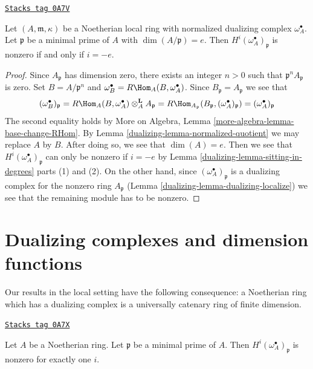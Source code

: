 \begin{lemma}
\label{dualizing-lemma-nonvanishing-generically-local}
\href{https://stacks.math.columbia.edu/tag/0A7V}{\texttt{Stacks tag 0A7V}}

Let $(A, \mathfrak m, \kappa)$ be a Noetherian local ring with
normalized dualizing complex $\omega_A^\bullet$.
Let $\mathfrak p$ be a minimal prime of $A$ with
$\dim(A/\mathfrak p) = e$. Then
$H^i(\omega_A^\bullet)_\mathfrak p$ is nonzero
if and only if $i = -e$.
\end{lemma}

\begin{proof}

Since $A_\mathfrak p$ has dimension zero, there exists an integer
$n > 0$ such that $\mathfrak p^nA_\mathfrak p$ is zero.
Set $B = A/\mathfrak p^n$ and
$\omega_B^\bullet = R\Hom_A(B, \omega_A^\bullet)$.
Since $B_\mathfrak p = A_\mathfrak p$ we see that
$$
(\omega_B^\bullet)_\mathfrak p =
R\Hom_A(B, \omega_A^\bullet) \otimes_A^\mathbf{L} A_\mathfrak p =
R\Hom_{A_\mathfrak p}(B_\mathfrak p, (\omega_A^\bullet)_\mathfrak p) =
(\omega_A^\bullet)_\mathfrak p
$$
The second equality holds by
More on Algebra, Lemma \ref{more-algebra-lemma-base-change-RHom}.
By Lemma \ref{dualizing-lemma-normalized-quotient} we may replace $A$ by $B$.
After doing so, we see that $\dim(A) = e$. Then we see that
$H^i(\omega_A^\bullet)_\mathfrak p$ can only be nonzero if $i = -e$
by Lemma \ref{dualizing-lemma-sitting-in-degrees} parts (1) and (2).
On the other hand, since $(\omega_A^\bullet)_\mathfrak p$
is a dualizing complex for the nonzero ring $A_\mathfrak p$
(Lemma \ref{dualizing-lemma-dualizing-localize})
we see that the remaining module has to be nonzero.
\end{proof}

\section{Dualizing complexes and dimension functions}
\label{dualizing-section-dimension-function}
Our results in the local setting have the following consequence:
a Noetherian ring which has a dualizing complex is a
universally catenary ring of finite dimension.

\begin{lemma}
\label{dualizing-lemma-nonvanishing-generically}
\href{https://stacks.math.columbia.edu/tag/0A7X}{\texttt{Stacks tag 0A7X}}

Let $A$ be a Noetherian ring. Let $\mathfrak p$ be a minimal prime
of $A$. Then $H^i(\omega_A^\bullet)_\mathfrak p$ is nonzero
for exactly one $i$.
\end{lemma}

